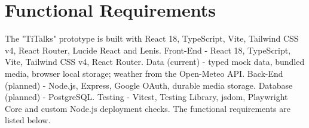 \documentclass{scrreprt}
\begin{document}
\section{Functional Requirements}
The "TiTalks" prototype is built with React 18, TypeScript, Vite, Tailwind CSS v4, React Router, Lucide React and Lenis.
\newline
Front-End - React 18, TypeScript, Vite, Tailwind CSS v4, React Router.
\newline
Data (current) - typed mock data, bundled media, browser local storage; weather from the Open-Meteo API.
\newline
Back-End (planned) - Node.js, Express, Google OAuth, durable media storage.
\newline
Database (planned) - PostgreSQL.
\newline
Testing - Vitest, Testing Library, jsdom, Playwright Core and custom Node.js deployment checks.
\newline
The functional requirements are listed below.
\end{document}
